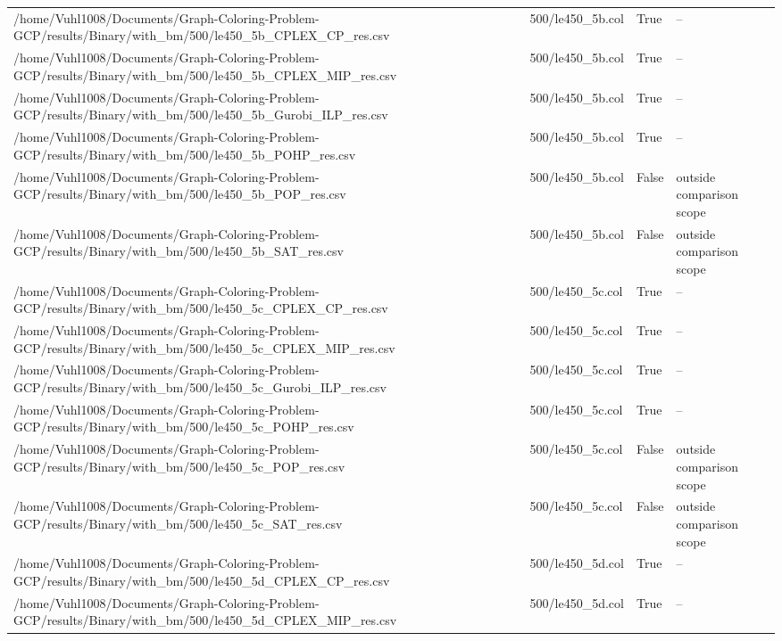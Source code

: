\begin{table}[htbp]
\begin{tabular}{llll}
/home/Vuhl1008/Documents/Graph-Coloring-Problem-GCP/results/Binary/with\_bm/500/le450\_5b\_CPLEX\_CP\_res.csv & 500/le450\_5b.col & True & -- \\
/home/Vuhl1008/Documents/Graph-Coloring-Problem-GCP/results/Binary/with\_bm/500/le450\_5b\_CPLEX\_MIP\_res.csv & 500/le450\_5b.col & True & -- \\
/home/Vuhl1008/Documents/Graph-Coloring-Problem-GCP/results/Binary/with\_bm/500/le450\_5b\_Gurobi\_ILP\_res.csv & 500/le450\_5b.col & True & -- \\
/home/Vuhl1008/Documents/Graph-Coloring-Problem-GCP/results/Binary/with\_bm/500/le450\_5b\_POHP\_res.csv & 500/le450\_5b.col & True & -- \\
/home/Vuhl1008/Documents/Graph-Coloring-Problem-GCP/results/Binary/with\_bm/500/le450\_5b\_POP\_res.csv & 500/le450\_5b.col & False & outside comparison scope \\
/home/Vuhl1008/Documents/Graph-Coloring-Problem-GCP/results/Binary/with\_bm/500/le450\_5b\_SAT\_res.csv & 500/le450\_5b.col & False & outside comparison scope \\
/home/Vuhl1008/Documents/Graph-Coloring-Problem-GCP/results/Binary/with\_bm/500/le450\_5c\_CPLEX\_CP\_res.csv & 500/le450\_5c.col & True & -- \\
/home/Vuhl1008/Documents/Graph-Coloring-Problem-GCP/results/Binary/with\_bm/500/le450\_5c\_CPLEX\_MIP\_res.csv & 500/le450\_5c.col & True & -- \\
/home/Vuhl1008/Documents/Graph-Coloring-Problem-GCP/results/Binary/with\_bm/500/le450\_5c\_Gurobi\_ILP\_res.csv & 500/le450\_5c.col & True & -- \\
/home/Vuhl1008/Documents/Graph-Coloring-Problem-GCP/results/Binary/with\_bm/500/le450\_5c\_POHP\_res.csv & 500/le450\_5c.col & True & -- \\
/home/Vuhl1008/Documents/Graph-Coloring-Problem-GCP/results/Binary/with\_bm/500/le450\_5c\_POP\_res.csv & 500/le450\_5c.col & False & outside comparison scope \\
/home/Vuhl1008/Documents/Graph-Coloring-Problem-GCP/results/Binary/with\_bm/500/le450\_5c\_SAT\_res.csv & 500/le450\_5c.col & False & outside comparison scope \\
/home/Vuhl1008/Documents/Graph-Coloring-Problem-GCP/results/Binary/with\_bm/500/le450\_5d\_CPLEX\_CP\_res.csv & 500/le450\_5d.col & True & -- \\
/home/Vuhl1008/Documents/Graph-Coloring-Problem-GCP/results/Binary/with\_bm/500/le450\_5d\_CPLEX\_MIP\_res.csv & 500/le450\_5d.col & True & -- \\

\end{tabular}
\end{table}
